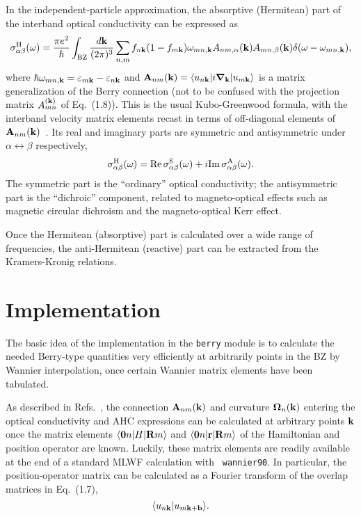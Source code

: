 In the independent-particle approximation, the absorptive (Hermitean)
part of the interband optical conductivity can be expressed as
%
$$
\sigma^{\rm H}_{\alpha\beta}(\omega)=\frac{\pi e^2}{\hbar}
\int_{\rm BZ}\frac{d{\bf
    k}}{(2\pi)^3}\sum_{n,m}f_{n{\bf k}}(1-f_{m{\bf k}})\omega_{mn,\bf k}
A_{nm,\alpha}({\bf k})A_{mn,\beta}({\bf k})
\delta(\omega-\omega_{mn,\bf k}),
$$
%
where $\hbar\omega_{mn,\bf k}=\varepsilon_{m{\bf
    k}}-\varepsilon_{n{\bf k}}$ and $ {\bf A}_{nm}({\bf k})=\langle
u_{n{\bf k}}\vert i\bm{\nabla}_{\bf k}\vert u_{m{\bf k}}\rangle$ is a
matrix generalization of the Berry connection (not to be confused with
the projection matrix $A^{({\bf k})}_{mn}$ of Eq.~(1.8)).  This is the
usual Kubo-Greenwood formula, with the interband velocity matrix
elements recast in terms of off-diagonal elements of ${\bf
  A}_{nm}({\bf k})$~\cite{blount}. Its real and imaginary parts are
symmetric and antisymmetric under $\alpha\leftrightarrow\beta$
respectively,
%
$$
\sigma^{\rm H}_{\alpha\beta}(\omega)={\rm Re}\,\sigma^{\rm S}_{\alpha\beta}(\omega)+
i{\rm Im}\, \sigma^{\rm A}_{\alpha\beta}(\omega).
$$
%
The symmetric part is the ``ordinary'' optical conductivity; the
antisymmetric part is the ``dichroic'' component, related to
magneto-optical effects such as magnetic circular dichroism and the
magneto-optical Kerr effect.

Once the Hermitean (absorptive) part is calculated over a wide range
of frequencies, the anti-Hermitean (reactive) part can be extracted
from the Kramers-Kronig relations.

\section{Implementation}

The basic idea of the implementation in the {\tt berry} module is to
calculate the needed Berry-type quantities very efficiently at
arbitrarily points in the BZ by Wannier interpolation, once certain
Wannier matrix elements have been tabulated.

As described in Refs.~\cite{wang-prb06,yates-prb07}, the connection
${\bf A}_{nm}({\bf k})$ and curvature $\bm{\Omega}_n({\bf k})$
entering the optical conductivity and AHC expressions can be
calculated at arbitrary points ${\bf k}$ once the matrix elements
$\langle {\bf 0}n\vert H\vert {\bf R}m\rangle$ and $\langle {\bf
  0}n\vert {\bf r}\vert {\bf R}m\rangle$ of the Hamiltonian and
position operator are known.  Luckily, these matrix elements are
readily available at the end of a standard MLWF calculation with {\tt
  wannier90}. In particular, the position-operator matrix can be
calculated as a Fourier transform of the overlap matrices in
Eq.~(1.7),
%
$$\langle u_{n{\bf k}}\vert u_{m{\bf k}+{\bf b}}\rangle.
$$

